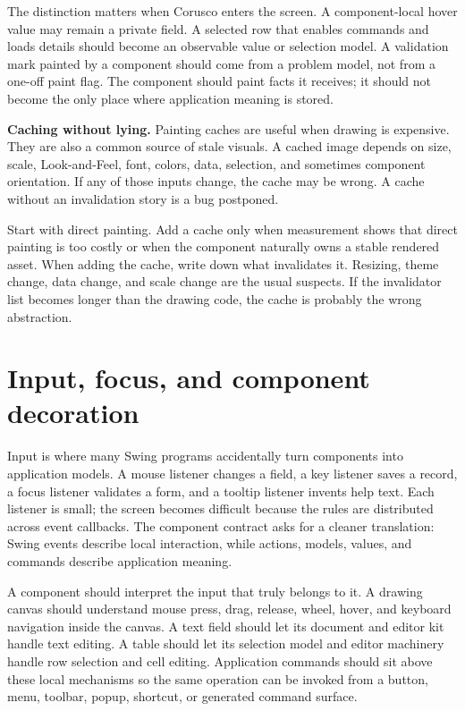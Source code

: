 The distinction matters when Corusco enters the screen. A component-local hover
value may remain a private field. A selected row that enables commands and loads
details should become an observable value or selection model. A validation mark
painted by a component should come from a problem model, not from a one-off
paint flag. The component should paint facts it receives; it should not become
the only place where application meaning is stored.

\textbf{Caching without lying.} Painting caches are useful when drawing is expensive. They are also a common
source of stale visuals. A cached image depends on size, scale, Look-and-Feel,
font, colors, data, selection, and sometimes component orientation. If any of
those inputs change, the cache may be wrong. A cache without an invalidation
story is a bug postponed.

Start with direct painting. Add a cache only when measurement shows that direct
painting is too costly or when the component naturally owns a stable rendered
asset. When adding the cache, write down what invalidates it. Resizing, theme
change, data change, and scale change are the usual suspects. If the invalidator
list becomes longer than the drawing code, the cache is probably the wrong
abstraction.

\section{Input, focus, and component decoration}

Input is where many Swing programs accidentally turn components into application models. A mouse listener changes a field, a key listener saves a record, a focus listener validates a form, and a tooltip listener invents help text. Each listener is small; the screen becomes difficult because the rules are distributed across event callbacks. The component contract asks for a cleaner translation: Swing events describe local interaction, while actions, models, values, and commands describe application meaning.

A component should interpret the input that truly belongs to it. A drawing canvas should understand mouse press, drag, release, wheel, hover, and keyboard navigation inside the canvas. A text field should let its document and editor kit handle text editing. A table should let its selection model and editor machinery handle row selection and cell editing. Application commands should sit above these local mechanisms so the same operation can be invoked from a button, menu, toolbar, popup, shortcut, or generated command surface.

